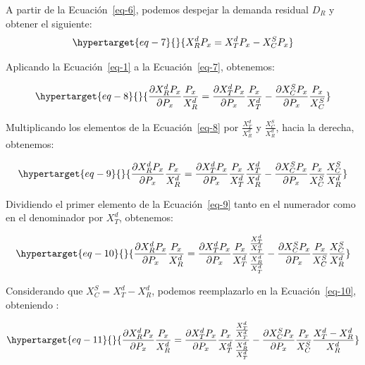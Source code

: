\documentclass[
  a4paper,
]{article}
\begin{document}
A partir de la Ecuación~\ref{eq-6}, podemos despejar la demanda residual
\(D_R\) y obtener el siguiente:
\begin{equation}\protect\hypertarget{eq-7}{}{
X_R^d P_x = X_T^d P_x - X_C^S P_x
}\label{eq-7}\end{equation}

Aplicando la Ecuación~\ref{eq-1} a la Ecuación~\ref{eq-7}, obtenemos:

\begin{equation}\protect\hypertarget{eq-8}{}{
\frac{\partial X_R^d P_x}{\partial P_x} \frac{P_x}{X_R^d} = \frac{\partial X_T^d P_x}{\partial P_x} \frac{P_x}{X_T^d} - \frac{\partial X_C^S P_x}{\partial P_x} \frac{P_x}{X_C^S}
}\label{eq-8}\end{equation}

Multiplicando los elementos de la Ecuación~\ref{eq-8} por
\(\frac{X_T^d}{X_R^d}\) y \(\frac{X_C^S}{X_R^d}\), hacia la derecha,
obtenemos:

\begin{equation}\protect\hypertarget{eq-9}{}{
\frac{\partial X_R^d P_x}{\partial P_x} \frac{P_x}{X_R^d} = \frac{\partial X_T^d P_x}{\partial P_x} \frac{P_x}{X_T^d} \frac{X_T^d}{X_R^d} - \frac{\partial X_C^S P_x}{\partial P_x} \frac{P_x}{X_C^S} \frac{X_C^S}{X_R^d}
}\label{eq-9}\end{equation}

Dividiendo el primer elemento de la Ecuación~\ref{eq-9} tanto en el
numerador como en el denominador por \(X_T^d\), obtenemos:

\begin{equation}\protect\hypertarget{eq-10}{}{
\frac{\partial X_R^d P_x}{\partial P_x} \frac{P_x}{X_R^d} = \frac{\partial X_T^d P_x}{\partial P_x} \frac{P_x}{X_T^d} \frac{\frac{X_T^d}{X_T^d}}{\frac{X_R^d}{X_T^d}} - \frac{\partial X_C^S P_x}{\partial P_x} \frac{P_x}{X_C^S} \frac{X_C^S}{X_R^d}
}\label{eq-10}\end{equation}

Considerando que \(X_C^S = X_T^d - X_R^d\), podemos reemplazarlo en la
Ecuación~\ref{eq-10}, obteniendo :

\begin{equation}\protect\hypertarget{eq-11}{}{
\frac{\partial X_R^d P_x}{\partial P_x} \frac{P_x}{X_R^d} = \frac{\partial X_T^d P_x}{\partial P_x} \frac{P_x}{X_T^d} \frac{\frac{X_T^d}{X_T^d}}{\frac{X_R^d}{X_T^d}} - \frac{\partial X_C^S P_x}{\partial P_x} \frac{P_x}{X_C^S} \frac{X_T^d - X_R^d}{X_R^d}
}\label{eq-11}\end{equation}
\end{document}
